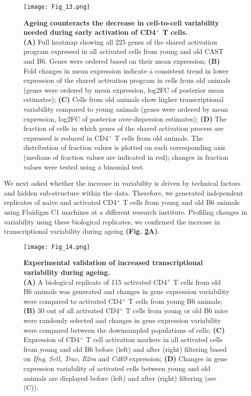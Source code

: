 \begin{figure}[!ht]
\centering
\texttt{[image: Fig\_13.png]}
\caption[Ageing destabilizes the CD4$^+$ T cell response]{\textbf{Ageing counteracts the decrease in cell-to-cell variability needed during early activation of CD4$^+$ T cells.} \\
\textbf{(A)} Full heatmap showing all 225 genes of the shared activation program expressed in all activated cells from young and old CAST and B6. Genes were ordered based on their mean expression; \textbf{(B)} Fold changes in mean expression indicate a consistent trend in lower expression of the shared activation program in cells from old animals (genes were ordered by mean expression, log2FC of posterior mean estimates); \textbf{(C)} Cells from old animals show higher transcriptional variability compared to young animals (genes were ordered by mean expression, log2FC of posterior over-dispersion estimates); \textbf{(D)} The fraction of cells in which genes of the shared activation process are expressed is reduced in CD4$^+$ T cells from old animals. The distribution of fraction values is plotted on each corresponding axis (medians of fraction values are indicated in red); changes in fraction values were tested using a binomial test.}
\label{fig1:variability_ageing}
\end{figure}

We next asked whether the increase in variability is driven by technical factors and hidden sub-structure within the data. Therefore, we generated independent replicates of naive and activated CD4$^+$ T cells from young and old B6 animals using Fluidigm C1 machines at a different research institute. Profiling changes in variability using these biological replicates, we confirmed the increase in transcriptional variability during ageing \textbf{(Fig. \ref{fig1:validation}A)}.

\begin{figure}[!ht]
\centering
\texttt{[image: Fig\_14.png]}
\caption[Experimental validation of increased transcriptional variability during ageing]{\textbf{Experimental validation of increased transcriptional variability during ageing.} \\
\textbf{(A)} A biological replicate of 115 activated CD4$^+$ T cells from old B6 animals was generated and changes in gene expression variability were compared to activated CD4$^+$ T cells from young B6 animals; \textbf{(B)} 30 out of all activated CD4$^+$ T cells from young or old B6 mice were randomly selected and changes in gene expression variability were compared between the downsampled populations of cells; \textbf{(C)} Expression of CD4$^+$ T cell activation markers in all activated cells from young and old B6 before (left) and after (right) filtering based on \textit{Ifng}, \textit{Sell}, \textit{Trac}, \textit{Il2ra} and \textit{Cd69} expression; \textbf{(D)} Changes in gene expression variability of activated cells between young and old animals are displayed before (left) and after (right) filtering (see (C)).}
\label{fig1:validation}
\end{figure}

